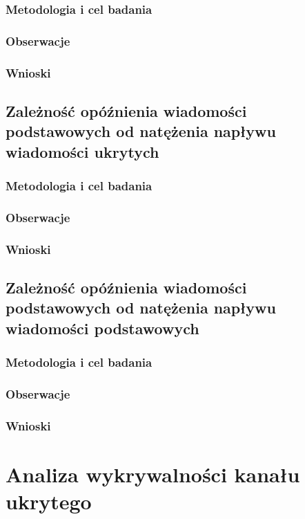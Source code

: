\documentclass[a4paper, twoside, 12pt]{report}
\begin{document}
        \subsection{Metodologia i cel badania}
        \subsection{Obserwacje}
        \subsection{Wnioski}

    \section{Zależność opóźnienia wiadomości podstawowych od natężenia napływu wiadomości ukrytych}
        \subsection{Metodologia i cel badania}
        \subsection{Obserwacje}
        \subsection{Wnioski}

    \section{Zależność opóźnienia wiadomości podstawowych od natężenia napływu wiadomości podstawowych}
        \subsection{Metodologia i cel badania}
        \subsection{Obserwacje}
        \subsection{Wnioski}


\chapter{Analiza wykrywalności kanału ukrytego}
\end{document}
